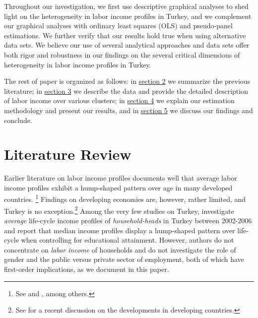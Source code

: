 \documentclass[12pt,author-year]{article}
\begin{document}
Throughout our investigation, we first use descriptive graphical analyses to shed light on the heterogeneity in labor income profiles in Turkey, and we complement our graphical analyses with ordinary least squares (OLS) and pseudo-panel estimations. We further verify that our results hold true when using alternative data sets. We believe our use of several analytical approaches and data sets offer both rigor and robustness in our findings on the several critical dimensions of heterogeneity in labor income profiles in Turkey. 

The rest of paper is organized as follows: in \hyperref[Section2]{section 2} we summarize the previous literature; in \hyperref[Section3]{section 3} we describe the data and provide the detailed description of labor income over various clusters; in \hyperref[Section4]{section 4} we explain our estimation methodology and present our results, and in \hyperref[Section5]{section 5} we discuss our findings and conclude.

\section{Literature Review}
\label{Section2}
Earlier literature on labor income profiles documents well that average labor income profiles exhibit a hump-shaped pattern over age in many developed countries.%
\footnote{See \cite{Attanasio} and \cite{Alessie}, among others.} Findings on developing economies are, however, rather limited, and Turkey is no exception.\footnote{See \cite{Lagakos} for a recent discussion on the developments in developing countries.} Among the very few studies on Turkey, \cite{Kirdar2} investigate \emph{average} life-cycle income profiles of \emph{household-heads} in Turkey between 2002-2006 and report that median income profiles display a hump-shaped pattern over life-cycle when controlling for educational attainment. However, authors do not concentrate on \emph{labor income} of households and do not investigate the role of gender and the public versus private sector of employment, both of which have first-order implications, as we document in this paper. 
\end{document}
